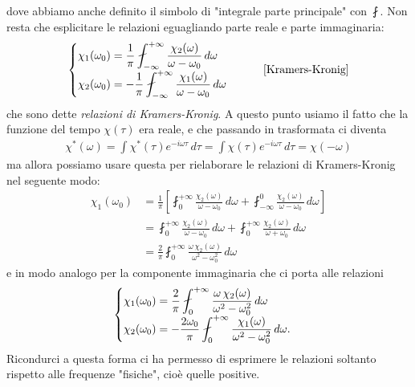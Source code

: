 dove abbiamo anche definito il simbolo di "integrale parte principale" con $ \fint $. Non resta che esplicitare le relazioni eguagliando parte reale e 
parte immaginaria:
\begin{align}
  \begin{cases}
    \DS \chi_1(\omega_0) =\frac1\pi \fint_{-\infty}^{+\infty} \frac{\chi_2(\omega)}{\omega - \omega_0} \,d\omega 
    \\
    \DS \chi_2(\omega_0) = - \frac1\pi \fint_{-\infty}^{+\infty} \frac{\chi_1(\omega)}{\omega - \omega_0} \,d\omega 
  \end{cases} \tag*{[Kramers-Kronig]}
\end{align}
che sono dette \textit{relazioni di Kramers-Kronig}. A questo punto usiamo il fatto che la funzione del tempo $ \chi(\tau) $ era reale, e che passando in 
trasformata ci diventa
\begin{align}
  \chi^*(\omega) = \int\chi^*(\tau) e^{-i\omega \tau} \,d\tau = \int \chi(\tau) e^{-i\omega \tau} \,d\tau = \chi(-\omega)
\end{align}
ma allora possiamo usare questa per rielaborare le relazioni di Kramers-Kronig nel seguente modo:
\begin{align}
  \chi_1(\omega_0) &= \frac1\pi \left[ \fint_{0}^{+\infty} \frac{\chi_2(\omega)}{\omega - \omega_0} \,d\omega 
  + \fint_{-\infty}^0 \frac{\chi_2(\omega)}{\omega - \omega_0} \,d\omega \right]
  \\
  &= \fint_{0}^{+\infty} \frac{\chi_2(\omega)}{\omega - \omega_0} \,d\omega 
  + \fint_{0}^{+\infty} \frac{\chi_2(\omega)}{\omega + \omega_0} \,d\omega
  \\
  &= \frac2\pi \fint_{0}^{+\infty} \frac{ \omega\, \chi_2(\omega)}{\omega^2 - \omega_0^2} \,d\omega
\end{align}
e in modo analogo per la componente immaginaria che ci porta alle relazioni
\begin{align}
  \begin{cases}
    \DS \chi_1(\omega_0) =\frac2\pi \fint_{0}^{+\infty} \frac{\omega \,\chi_2(\omega)}{\omega^2 - \omega_0^2} \,d\omega 
    \\
    \DS \chi_2(\omega_0) = - \frac{2\omega_0}\pi \fint_{0}^{+\infty} \frac{\chi_1(\omega)}{\omega^2 - \omega_0^2} \,d\omega.
  \end{cases}
\end{align}
Ricondurci a questa forma ci ha permesso di esprimere le relazioni soltanto rispetto alle frequenze "fisiche", cioè quelle positive.

